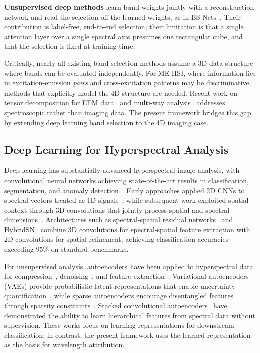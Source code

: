 \textbf{Unsupervised deep methods} learn band weights jointly with a reconstruction network and read the selection off the learned weights, as in BS-Nets~\cite{cai2020bsnets}.
Their contribution is label-free, end-to-end selection; their limitation is that a single attention layer over a single spectral axis presumes one rectangular cube, and that the selection is fixed at training time.

Critically, nearly all existing band selection methods assume a 3D data structure where bands can be evaluated independently.
For ME-HSI, where information lies in excitation-emission \emph{pairs} and cross-excitation patterns may be discriminative, methods that explicitly model the 4D structure are needed.
Recent work on tensor decomposition for EEM data~\cite{murphy2013fluorescence} and multi-way analysis~\cite{bro1997parafac} addresses spectroscopic rather than imaging data.
The present framework bridges this gap by extending deep learning band selection to the 4D imaging case.

\subsection{Deep Learning for Hyperspectral Analysis}
\label{sec:related_dl}

Deep learning has substantially advanced hyperspectral image analysis, with convolutional neural networks achieving state-of-the-art results in classification, segmentation, and anomaly detection~\cite{li2019deep,paoletti2019deep}.
Early approaches applied 2D CNNs to spectral vectors treated as 1D signals~\cite{hu2015deep}, while subsequent work exploited spatial context through 3D convolutions that jointly process spatial and spectral dimensions~\cite{chen2016deep}.
Architectures such as spectral-spatial residual networks~\cite{zhong2017spectral} and HybridSN~\cite{roy2020hybridsn} combine 3D convolutions for spectral-spatial feature extraction with 2D convolutions for spatial refinement, achieving classification accuracies exceeding 95\% on standard benchmarks.

For unsupervised analysis, autoencoders have been applied to hyperspectral data for compression~\cite{chen2014deep}, denoising~\cite{vincent2008extracting}, and feature extraction~\cite{mou2017unsupervised}.
Variational autoencoders (VAEs) provide probabilistic latent representations that enable uncertainty quantification~\cite{kingma2013auto}, while sparse autoencoders encourage disentangled features through sparsity constraints~\cite{ng2011sparse}.
Stacked convolutional autoencoders~\cite{masci2011stacked} have demonstrated the ability to learn hierarchical features from spectral data without supervision.
These works focus on learning representations for downstream classification; in contrast, the present framework uses the learned representation as the basis for wavelength attribution.

